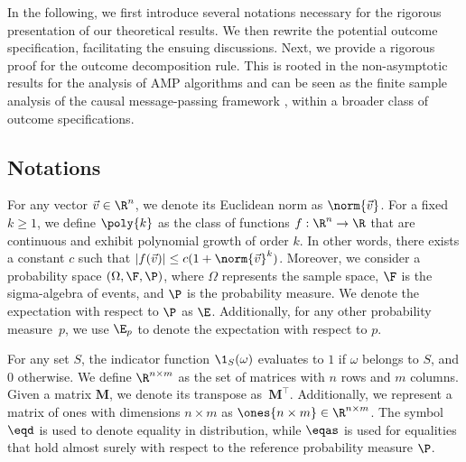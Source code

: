 In the following, we first introduce several notations necessary for the rigorous presentation of our theoretical results. We then rewrite the potential outcome specification, facilitating the ensuing discussions. Next, we provide a rigorous proof for the outcome decomposition rule. This is rooted in the non-asymptotic results for the analysis of AMP algorithms \citep{li2022non} and can be seen as the finite sample analysis of the causal message-passing framework \citep{shirani2024causal}, within a broader class of outcome specifications.

\subsection{Notations}
\label{apndx:notations}
% 
For any vector $\Vec{v} \in \R^n$, we denote its Euclidean norm as $\norm{\Vec{v}}$. For a fixed $k \geq 1$, we define $\poly{k}$ as the class of functions $f: \R^n \rightarrow \R$ that are continuous and exhibit polynomial growth of order $k$. In other words, there exists a constant $c$ such that $|f(\Vec{v})| \leq c(1+\norm{\Vec{v}}^k)$. Moreover, we consider a probability space $(\Omega, \F, \P)$, where $\Omega$ represents the sample space, $\F$ is the sigma-algebra of events, and $\P$ is the probability measure. We denote the expectation with respect to $\P$ as $\E$. Additionally, for any other probability measure~$p$, we use $\E_p$ to denote the expectation with respect to $p$. 

For any set $S$, the indicator function $\1_S(\omega)$ evaluates to $1$ if $\omega$ belongs to $S$, and $0$ otherwise. We define $\R^{n\times m}$ as the set of matrices with $n$ rows and $m$ columns. Given a matrix $\bm{M}$, we denote its transpose as~$\bm{M}^\top$. Additionally, we represent a matrix of ones with dimensions $n\times m$ as $\ones{n\times m} \in \R^{n\times m}$. The symbol $\eqd$ is used to denote equality in distribution, while $\eqas$ is used for equalities that hold almost surely with respect to the reference probability measure $\P$.

